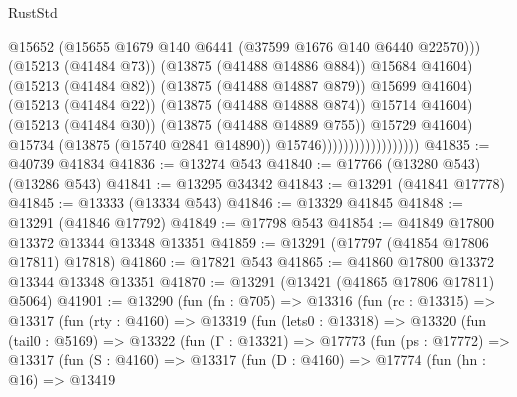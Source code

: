 \begin{lexlean}{RustStd}
\begin{coremodule}
                                                  @15652
                                                  (@15655
                                                    @1679
                                                    @140
                                                    @6441
                                                    (@37599 @1676 @140 @6440 @22570)))
                                                (@15213 (@41484 @73))
                                                (@13875 (@41488 @14886 @884))
                                                @15684
                                                @41604)
                                              (@15213 (@41484 @82))
                                              (@13875 (@41488 @14887 @879))
                                              @15699
                                              @41604)
                                            (@15213 (@41484 @22))
                                            (@13875 (@41488 @14888 @874))
                                            @15714
                                            @41604)
                                          (@15213 (@41484 @30))
                                          (@13875 (@41488 @14889 @755))
                                          @15729
                                          @41604)
                                        @15734
                                        (@13875 (@15740 @2841 @14890))
                                        @15746))))))))))))))))))
@41835 := @40739 @41834
@41836 := @13274 @543
@41840 := @17766 (@13280 @543) (@13286 @543)
@41841 := @13295 @34342
@41843 := @13291 (@41841 @17778)
@41845 := @13333 (@13334 @543)
@41846 := @13329 @41845
@41848 := @13291 (@41846 @17792)
@41849 := @17798 @543
@41854 := @41849 @17800 @13372 @13344 @13348 @13351
@41859 := @13291 (@17797 (@41854 @17806 @17811) @17818)
@41860 := @17821 @543
@41865 := @41860 @17800 @13372 @13344 @13348 @13351
@41870 := @13291 (@13421 (@41865 @17806 @17811) @5064)
@41901 := @13290
    (fun (fn : @705) =>
    @13316
      (fun (rc : @13315) =>
      @13317
        (fun (rty : @4160) =>
        @13319
          (fun (lets0 : @13318) =>
          @13320
            (fun (tail0 : @5169) =>
            @13322
              (fun (Γ : @13321) =>
              @17773
                (fun (ps : @17772) =>
                @13317
                  (fun (S : @4160) =>
                  @13317
                    (fun (D : @4160) =>
                    @17774
                      (fun (hn : @16) =>
                      @13419

\end{coremodule}
\end{lexlean}
